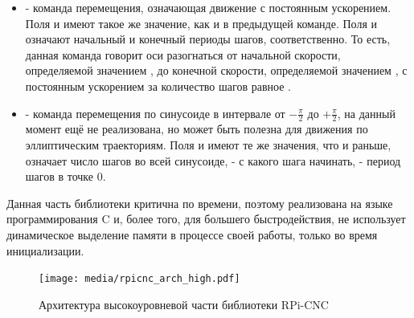 \documentclass[14pt,russian,a4paper]{extarticle}
\newcommand{\gb}[1]{\guillemotleft #1\guillemotright}
\newcounter{subsubsubsection}[subsubsection]
\begin{document}
\begin{itemize}
    \item {} - команда перемещения, означающая движение с постоянным ускорением. Поля \gb{} и \gb{} имеют такое же значение, как и в предыдущей команде. Поля \gb{} и \gb{} означают начальный и конечный периоды шагов, соответственно. То есть, данная команда говорит оси разогнаться от начальной скорости, определяемой значением \gb{}, до конечной скорости, определяемой значением \gb{}, с постоянным ускорением за количество шагов равное \gb{}.
    \item {} - команда перемещения по синусоиде в интервале от $-\frac{\pi}{2}$ до $+\frac{\pi}{2}$, на данный момент ещё не реализована, но может быть полезна для движения по эллиптическим траекториям. Поля \gb{} и \gb{} имеют те же значения, что и раньше, \gb{} означает число шагов во всей синусоиде, \gb{} - с какого шага начинать, \gb{} - период шагов в точке 0.
\end{itemize}
Данная часть библиотеки критична по времени, поэтому реализована на языке программирования C и, более того, для большего быстродействия, не использует динамическое выделение памяти в процессе своей работы, только во время инициализации.


\begin{figure}[h!]
    \centerline{\texttt{[image: media/rpicnc\_arch\_high.pdf]}}
    \caption{Архитектура высокоуровневой части библиотеки RPi-CNC}
    \label{fig:rpicnc_arch_high}
\end{figure}
\end{document}
